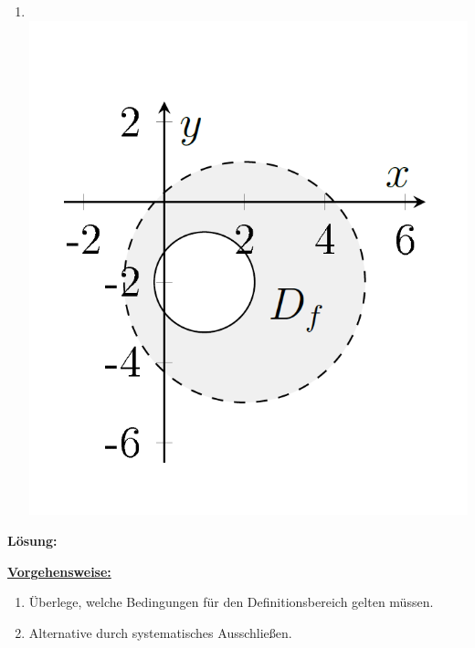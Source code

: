 \begin{enumerate}
\item \text{} \\
\includegraphics[scale=0.3]{pictures/BildD}
\end{enumerate}

\textbf{Lösung:}
\begin{mdframed}
\underline{\textbf{Vorgehensweise:}}
\renewcommand{\labelenumi}{\theenumi.}
\begin{enumerate}
\item Überlege, welche Bedingungen für den Definitionsbereich gelten müssen.
\item Alternative durch systematisches Ausschließen.
\end{enumerate}
\end{mdframed}

